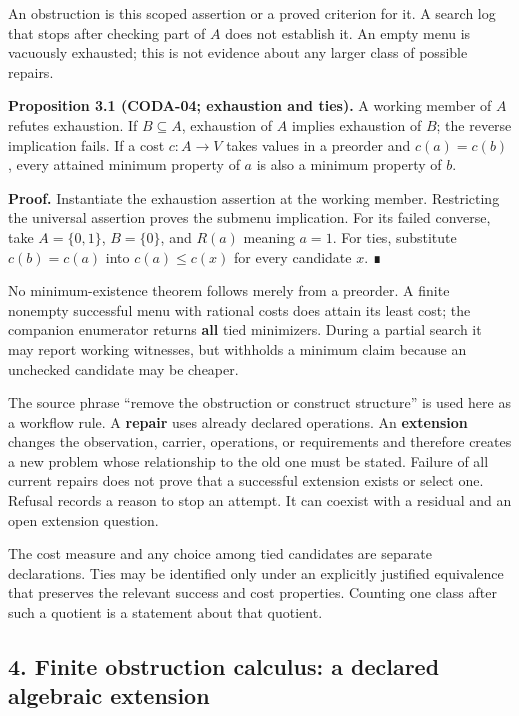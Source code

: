 \documentclass[
  11pt,
]{article}
\begin{document}
An obstruction is this scoped assertion or a proved criterion for it. A search log that stops after checking part of \(A\) does not establish it. An empty menu is vacuously exhausted; this is not evidence about any larger class of possible repairs.

\textbf{Proposition 3.1 (CODA-04; exhaustion and ties).} A working member of \(A\) refutes exhaustion. If \(B\subseteq A\), exhaustion of \(A\) implies exhaustion of \(B\); the reverse implication fails. If a cost \(c:A\to V\) takes values in a preorder and \(c(a)=c(b)\), every attained minimum property of \(a\) is also a minimum property of \(b\).

\textbf{Proof.} Instantiate the exhaustion assertion at the working member. Restricting the universal assertion proves the submenu implication. For its failed converse, take \(A=\{0,1\}\), \(B=\{0\}\), and \(R(a)\) meaning \(a=1\). For ties, substitute \(c(b)=c(a)\) into \(c(a)\le c(x)\) for every candidate \(x\). ∎

No minimum-existence theorem follows merely from a preorder. A finite nonempty successful menu with rational costs does attain its least cost; the companion enumerator returns \textbf{all} tied minimizers. During a partial search it may report working witnesses, but withholds a minimum claim because an unchecked candidate may be cheaper.

The source phrase ``remove the obstruction or construct structure'' is used here as a workflow rule. A \textbf{repair} uses already declared operations. An \textbf{extension} changes the observation, carrier, operations, or requirements and therefore creates a new problem whose relationship to the old one must be stated. Failure of all current repairs does not prove that a successful extension exists or select one. Refusal records a reason to stop an attempt. It can coexist with a residual and an open extension question.

The cost measure and any choice among tied candidates are separate declarations. Ties may be identified only under an explicitly justified equivalence that preserves the relevant success and cost properties. Counting one class after such a quotient is a statement about that quotient.

\subsection{4. Finite obstruction calculus: a declared algebraic extension}\label{finite-obstruction-calculus-a-declared-algebraic-extension}
\end{document}
